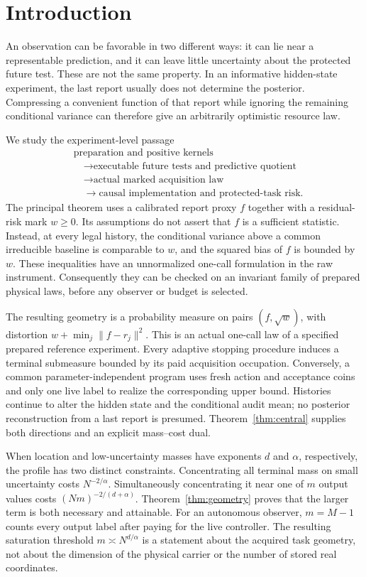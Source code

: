 \section{Introduction}
An observation can be favorable in two different ways: it can lie near a representable prediction, and it can leave little uncertainty about the protected future test. These are not the same property. In an informative hidden-state experiment, the last report usually does not determine the posterior. Compressing a convenient function of that report while ignoring the remaining conditional variance can therefore give an arbitrarily optimistic resource law.

We study the experiment-level passage
\[
\begin{aligned}
&\text{preparation and positive kernels}\\
&\quad\longrightarrow\text{executable future tests and predictive quotient}\\
&\quad\longrightarrow\text{actual marked acquisition law}\\
&\quad\longrightarrow\text{causal implementation and protected-task risk}.
\end{aligned}
\]
The principal theorem uses a calibrated report proxy $f$ together with a residual-risk mark $w\ge0$. Its assumptions do not assert that $f$ is a sufficient statistic. Instead, at every legal history, the conditional variance above a common irreducible baseline is comparable to $w$, and the squared bias of $f$ is bounded by $w$. These inequalities have an unnormalized one-call formulation in the raw instrument. Consequently they can be checked on an invariant family of prepared physical laws, before any observer or budget is selected.

The resulting geometry is a probability measure on pairs $(f,\sqrt w)$, with distortion $w+\min_j\|f-r_j\|^2$. This is an actual one-call law of a specified prepared reference experiment. Every adaptive stopping procedure induces a terminal submeasure bounded by its paid acquisition occupation. Conversely, a common parameter-independent program uses fresh action and acceptance coins and only one live label to realize the corresponding upper bound. Histories continue to alter the hidden state and the conditional audit mean; no posterior reconstruction from a last report is presumed. Theorem~\ref{thm:central} supplies both directions and an explicit mass--cost dual.

When location and low-uncertainty masses have exponents $d$ and $\alpha$, respectively, the profile has two distinct constraints. Concentrating all terminal mass on small uncertainty costs $N^{-2/\alpha}$. Simultaneously concentrating it near one of $m$ output values costs $(Nm)^{-2/(d+\alpha)}$. Theorem~\ref{thm:geometry} proves that the larger term is both necessary and attainable. For an autonomous observer, $m=M-1$ counts every output label after paying for the live controller. The resulting saturation threshold $m\asymp N^{d/\alpha}$ is a statement about the acquired task geometry, not about the dimension of the physical carrier or the number of stored real coordinates.


